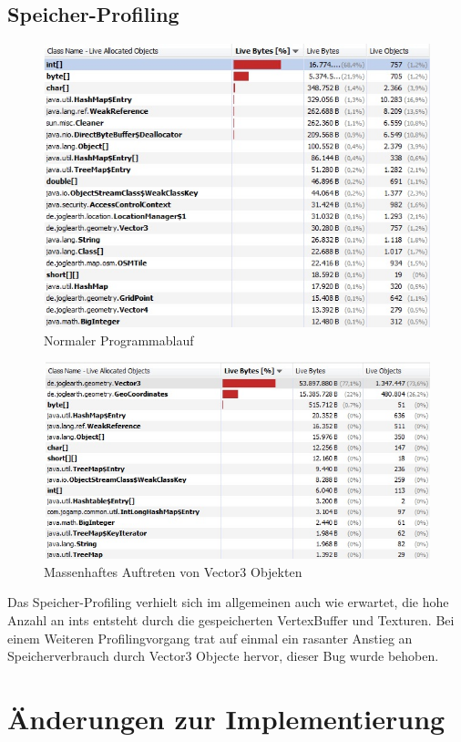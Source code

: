 \documentclass[10pt]{scrreprt}
\begin{document}
\section{Speicher-Profiling}
\begin{figure}[!htb]
\centering
\includegraphics[scale=0.8]{memory_profile_normal.jpg}
\caption{Normaler Programmablauf}
\end{figure}
\begin{figure}[!htb]
\centering
\hspace{5mm}
\includegraphics[scale=0.8]{memory_profile_shitgotreal.jpg}
\caption{Massenhaftes Auftreten von Vector3 Objekten}
\end{figure}
Das Speicher-Profiling verhielt sich im allgemeinen auch wie erwartet, die hohe Anzahl an ints entsteht durch die gespeicherten VertexBuffer und Texturen.
Bei einem Weiteren Profilingvorgang trat auf einmal ein rasanter Anstieg an Speicherverbrauch durch Vector3 Objecte hervor, dieser Bug wurde behoben.
\chapter{Änderungen zur Implementierung}
\end{document}
